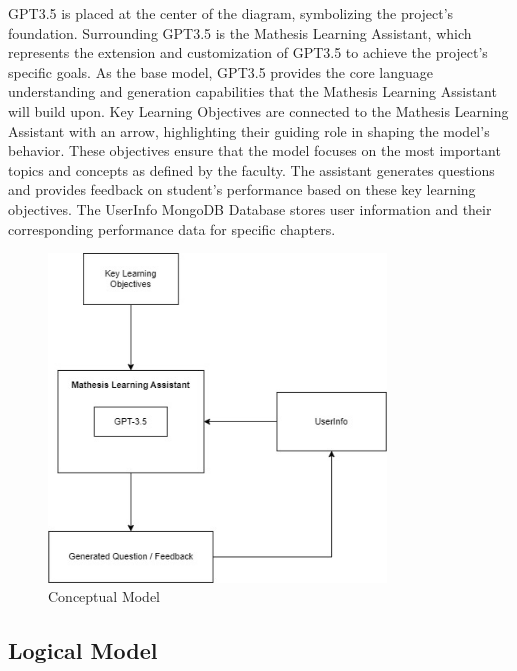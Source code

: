 \documentclass[12pt,a4paper]{article}
\begin{document}
    GPT3.5 is placed at the center of the diagram, symbolizing the project's foundation. Surrounding GPT3.5 is the Mathesis Learning Assistant, which represents the extension and customization of GPT3.5 to achieve the project's specific goals. As the base model, GPT3.5 provides the core language understanding and generation capabilities that the Mathesis Learning Assistant will build upon. Key Learning Objectives are connected to the Mathesis Learning Assistant with an arrow, highlighting their guiding role in shaping the model's behavior. These objectives ensure that the model focuses on the most important topics and concepts as defined by the faculty. The assistant generates questions and provides feedback on student's performance based on these key learning objectives. The UserInfo MongoDB Database stores user information and their corresponding performance data for specific chapters.
    \begin{figure}[h]
        \centering
        \includegraphics[width=0.8\textwidth]{Conceptual_diagram.jpg}
        \caption{Conceptual Model}
        \label{fig:GPT Pedagpgy}
    \end{figure}
    \subsection{Logical Model}
    
\end{document}
